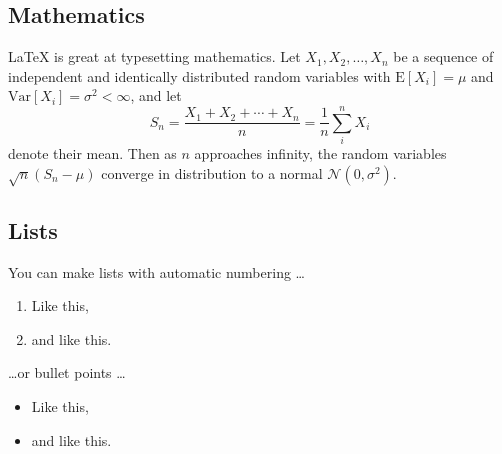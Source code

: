 \documentclass[12pt]{article}
\begin{document}
		\subsection{Mathematics}
		
		\LaTeX{} is great at typesetting mathematics. Let $X_1, X_2, \ldots, X_n$ be a sequence of independent and identically distributed random variables with $\text{E}[X_i] = \mu$ and $\text{Var}[X_i] = \sigma^2 < \infty$, and let
		$$S_n = \frac{X_1 + X_2 + \cdots + X_n}{n}
		= \frac{1}{n}\sum_{i}^{n} X_i$$
		denote their mean. Then as $n$ approaches infinity, the random variables $\sqrt{n}(S_n - \mu)$ converge in distribution to a normal $\mathcal{N}(0, \sigma^2)$.
		
		\subsection{Lists}
		
		You can make lists with automatic numbering \dots
		
		\begin{enumerate}
			\item Like this,
			\item and like this.
		\end{enumerate}
		\dots or bullet points \dots
		\begin{itemize}
			\item Like this,
			\item and like this.
		\end{itemize}
	\fi
	
\end{document}
